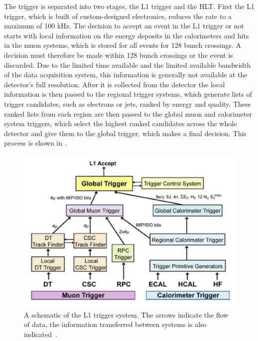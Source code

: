 The trigger is separated into two stages, the \ac{L1} trigger and the \ac{HLT}. First the \ac{L1} trigger, which is built of custom-designed electronics, reduces the rate to a maximum of 100 kHz. The decision to accept an event in the \ac{L1} trigger or not starts with local information on the energy deposits in the calorimeters and hits in the muon systems, which is stored for all events for 128 bunch crossings. A decision must therefore be made within 128 bunch crossings or the event is discarded. Due to the limited time available and the limited available bandwidth of the data acquisition system, this information is generally not available at the detector's full resolution. After it is collected from the detector the local information is then passed to the regional trigger systems, which generate lists of trigger candidates, such as electrons or jets, ranked by energy and quality. These ranked lists from each region are then passed to the global muon and calorimeter system triggers, which select the highest ranked candidates across the whole detector and give them to the global trigger, which makes a final decision. This process is shown in .

\begin{figure}
  \includegraphics[width=1.2\largefigwidth]{plots/detector/L1T_Layout.png}
  \caption[A schematic of the L1 trigger system. The arrows indicate the flow of data, the information transferred between systems is also indicated.]{A schematic of the L1 trigger system. The arrows indicate the flow of data, the information transferred between systems is also indicated~\cite{Chatrchyan:2008aa}.}
  \label{fig:l1layout}
\end{figure}

